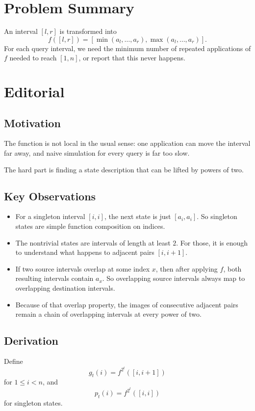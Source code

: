 \section{Problem Summary}
An interval \([l,r]\) is transformed into
\[
f([l,r]) = [\min(a_l,\dots,a_r), \max(a_l,\dots,a_r)].
\]
For each query interval, we need the minimum number of repeated applications of \(f\) needed to reach \([1,n]\), or report that this never happens.

\section{Editorial}
\subsection{Motivation}
The function is not local in the usual sense: one application can move the interval far away, and naive simulation for every query is far too slow.

The hard part is finding a state description that can be lifted by powers of two.

\subsection{Key Observations}
\begin{itemize}
\item For a singleton interval \([i,i]\), the next state is just \([a_i,a_i]\). So singleton states are simple function composition on indices.
\item The nontrivial states are intervals of length at least \(2\). For those, it is enough to understand what happens to adjacent pairs \([i,i+1]\).
\item If two source intervals overlap at some index \(x\), then after applying \(f\), both resulting intervals contain \(a_x\). So overlapping source intervals always map to overlapping destination intervals.
\item Because of that overlap property, the images of consecutive adjacent pairs remain a chain of overlapping intervals at every power of two.
\end{itemize}

\subsection{Derivation}
Define
\[
g_t(i) = f^{2^t}([i,i+1])
\]
for \(1 \le i < n\), and
\[
p_t(i) = f^{2^t}([i,i])
\]
for singleton states.

